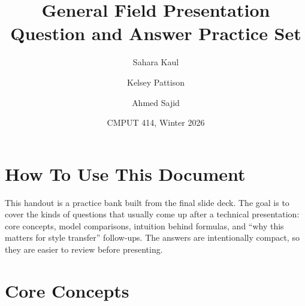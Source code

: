 \documentclass[11pt]{article}
\title{General Field Presentation\\Question and Answer Practice Set}
\author{Sahara Kaul \and Kelsey Pattison \and Ahmed Sajid}
\date{CMPUT 414, Winter 2026}
\begin{document}
\color{Ink}
\maketitle

\section*{How To Use This Document}
This handout is a practice bank built from the final slide deck. The goal is to cover the kinds of questions that usually come up after a technical presentation: core concepts, model comparisons, intuition behind formulas, and ``why this matters for style transfer'' follow-ups. The answers are intentionally compact, so they are easier to review before presenting.

\tableofcontents
\newpage

\section{Core Concepts}
\end{document}
